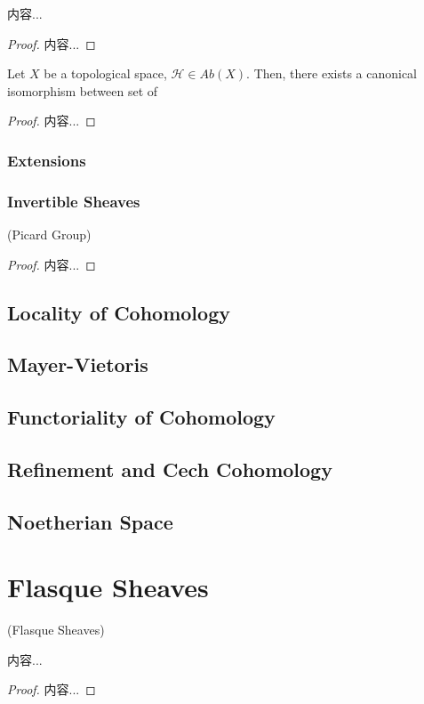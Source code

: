 \documentclass[Total.tex]{subfiles}
\begin{document}
					\begin{lemma}
						内容...
					\end{lemma}
					\begin{proof}
						内容...
					\end{proof}
					
					\begin{lemma}
						Let $X$ be a topological space, $\mathcal{H}\in Ab(X)$. Then, there exists a canonical isomorphism between set of 
					\end{lemma}
					\begin{proof}
						内容...
					\end{proof}
					\subsubsection{Extensions}
					\subsubsection{Invertible Sheaves}
					\begin{lemma}
						(Picard Group)
					\end{lemma}
					\begin{proof}
						内容...
					\end{proof}
				\subsection{Locality of Cohomology}
				\subsection{Mayer-Vietoris}	
				\subsection{Functoriality of Cohomology}
				\subsection{Refinement and Cech Cohomology}
				\subsection{Noetherian Space}
			\section{Flasque Sheaves}
				\begin{Def}
					(Flasque Sheaves) 
				\end{Def}
				\begin{lemma}
					内容...
				\end{lemma}
				\begin{proof}
					内容...
				\end{proof}
\end{document}
